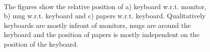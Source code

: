 \documentclass[letterpaper, 10 pt, conference]{ieeeconf}  %
\begin{document}

\begin{figure}
\begin{center}
\quad
{}\\
\end{center}
\caption{The figures show the relative position of a) keyboard w.r.t. monitor, b) mug w.r.t. keyboard and c) papers w.r.t. keyboard. Qualitatively keyboards are mostly infront of monitors, mugs are around the keyboard and the position of papers is mostly independent on the position of the keyboard.} 
\label{fig:scatter-rest}
\end{figure}
\end{document}
